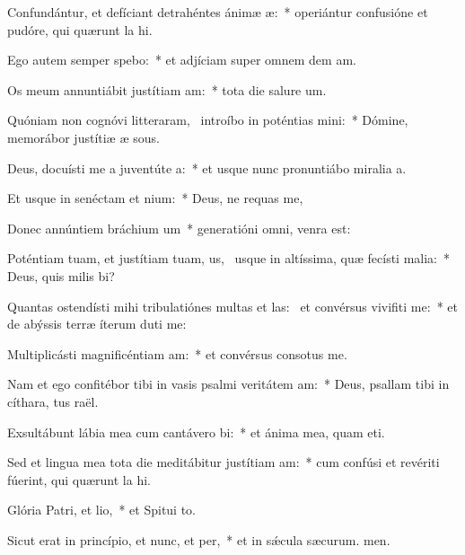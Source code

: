\item Confundántur, et defíciant detrahéntes ánimæ æ:~* operiántur confusióne et pudóre, qui quærunt la hi.
\item Ego autem semper spebo:~* et adjíciam super omnem dem am.
\item Os meum annuntiábit justítiam am:~* tota die salure um.
\item Quóniam non cognóvi litteraram,~\pscross{} introíbo in poténtias mini:~* Dómine, memorábor justítiæ æ sous.
\item Deus, docuísti me a juventúte a:~* et usque nunc pronuntiábo miralia a.
\item Et usque in senéctam et nium:~* Deus, ne requas me,
\item Donec annúntiem bráchium um~* generatióni omni,  venra est:
\item Poténtiam tuam, et justítiam tuam, us,~\pscross{} usque in altíssima, quæ fecísti malia:~* Deus, quis milis bi?
\item Quantas ostendísti mihi tribulatiónes multas et las:~\pscross{} et convérsus vivifiti me:~* et de abýssis terræ íterum duti me:
\item Multiplicásti magnificéntiam am:~* et convérsus consotus  me.
\item Nam et ego confitébor tibi in vasis psalmi veritátem am:~* Deus, psallam tibi in cíthara, tus raël.
\item Exsultábunt lábia mea cum cantávero bi:~* et ánima mea, quam eti.
\item Sed et lingua mea tota die meditábitur justítiam am:~* cum confúsi et revériti fúerint, qui quærunt la hi.
\item Glória Patri, et lio,~* et Spitui to.
\item Sicut erat in princípio, et nunc, et per,~* et in sǽcula sæcurum. men.
